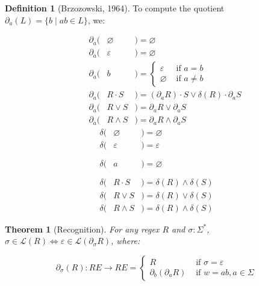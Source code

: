 \documentclass[11pt]{article}
\theoremstyle{plain}
\newtheorem{theorem}{Theorem}
\theoremstyle{definition}
\newtheorem{definition}{Definition}
\begin{document}
\begin{definition}[Brzozowski, 1964]
To compute the quotient \(\partial_a(L) = \{b \mid ab \in L\}\), we:

\vspace{-0.8cm}
\begin{multicols}{2}
\begin{eqnarray*}
\phantom{--}\partial_a(& \varnothing &) = \varnothing                                           \\
\phantom{--}\partial_a(& \varepsilon &) = \varnothing                                           \\
\phantom{--}\partial_a(& b           &) = \begin{cases}\varepsilon &\text{ if } a = b\\ \varnothing &\text{ if } a \neq b \end{cases}\\
\phantom{--}\partial_a(& R\cdot S    &) = (\partial_a R)\cdot S \vee \delta(R)\cdot\partial_a S \\
\phantom{--}\partial_a(& R\vee S     &) = \partial_a R \vee \partial_a S                        \\
\phantom{--}\partial_a(& R\land S    &) = \partial_a R \land \partial_a S
\end{eqnarray*} \break\vspace{-0.45cm}
\begin{eqnarray*}
\delta(& \varnothing &)= \varnothing                                      \\
\delta(& \varepsilon &)= \varepsilon                                      \\
\delta(& a           &)= \varnothing\phantom{\begin{cases}\varepsilon\\\varnothing\end{cases}}\\
\delta(& R\cdot S    &)= \delta(R) \land \delta(S)                        \\
\delta(& R\vee S     &)= \delta(R) \vee  \delta(S)                        \\
\delta(& R\land S    &)= \delta(R) \land \delta(S)
\end{eqnarray*}
\end{multicols}
\end{definition}

\begin{theorem}[Recognition]
  For any regex \(R\) and \(\sigma: \Sigma^*\), \(\sigma \in \mathcal{L}(R) \Longleftrightarrow \varepsilon \in \mathcal{L}(\partial_\sigma R)\), where:

  \[
    \partial_\sigma (R): RE \rightarrow RE = \begin{cases}R &\text{ if } \sigma = \varepsilon\\\partial_b(\partial_a R) &\text{ if } w = ab, a \in \Sigma\end{cases}
  \]
\end{theorem}
\end{document}

